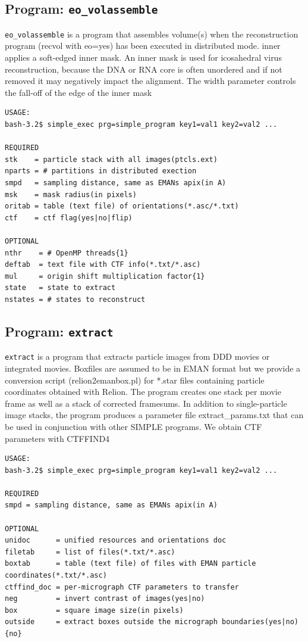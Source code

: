 \documentclass[a4paper,11pt]{article}
\newcommand{\prgname}[1]{\textcolor{NavyBlue}{\texttt{#1}}}
\begin{document}
\subsection{Program: \prgname{eo\_volassemble}}
\label{eo_volassemble}
\prgname{eo\_volassemble} is a program that assembles volume(s) when the reconstruction program (recvol with eo=yes) has been executed in distributed mode. inner applies a soft-edged inner mask. An inner mask is used for icosahedral virus reconstruction, because the DNA or RNA core is often unordered and  if not removed it may negatively impact the alignment. The width parameter controls the fall-off of the edge of the inner mask

\begin{verbatim}
USAGE:
bash-3.2$ simple_exec prg=simple_program key1=val1 key2=val2 ...

REQUIRED
stk    = particle stack with all images(ptcls.ext)
nparts = # partitions in distributed exection
smpd   = sampling distance, same as EMANs apix(in A)
msk    = mask radius(in pixels)
oritab = table (text file) of orientations(*.asc/*.txt)
ctf    = ctf flag(yes|no|flip)

OPTIONAL
nthr    = # OpenMP threads{1}
deftab  = text file with CTF info(*.txt/*.asc)
mul     = origin shift multiplication factor{1}
state   = state to extract
nstates = # states to reconstruct
\end{verbatim}

\subsection{Program: \prgname{extract}}
\label{extract}
\prgname{extract} is a program that extracts particle images from DDD movies or integrated movies. Boxfiles are assumed to be in EMAN format but we provide a conversion script (relion2emanbox.pl) for *.star files containing particle coordinates obtained with Relion. The program creates one stack per movie frame as well as a stack of corrected framesums. In addition to single-particle image stacks, the program produces a parameter file extract\_params.txt that can be used in conjunction with other SIMPLE programs. We obtain CTF parameters with CTFFIND4

\begin{verbatim}
USAGE:
bash-3.2$ simple_exec prg=simple_program key1=val1 key2=val2 ...

REQUIRED
smpd = sampling distance, same as EMANs apix(in A)

OPTIONAL
unidoc      = unified resources and orientations doc
filetab     = list of files(*.txt/*.asc)
boxtab      = table (text file) of files with EMAN particle coordinates(*.txt/*.asc)
ctffind_doc = per-micrograph CTF parameters to transfer
neg         = invert contrast of images(yes|no)
box         = square image size(in pixels)
outside     = extract boxes outside the micrograph boundaries(yes|no){no}
\end{verbatim}
\end{document}

